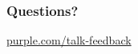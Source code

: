 \documentclass[t]{beamer}
\begin{document}
\begin{frame}
  \frametitle{}

  \note{

  }
  
\end{frame}

\begin{frame}
  \frametitle{}

  \note{

  }
  
\end{frame}

\begin{frame}
  \frametitle{}

  \note{

  }
  
\end{frame}

\begin{frame}
  \frametitle{}

  \note{

  }
  
\end{frame}

\begin{frame}
  \frametitle{}

  \note{

  }
  
\end{frame}

\begin{frame}
  \frametitle{Questions?}
  \vspace{3cm}
  \centerline{\large\url{purple.com/talk-feedback}}
\end{frame}
\end{document}
